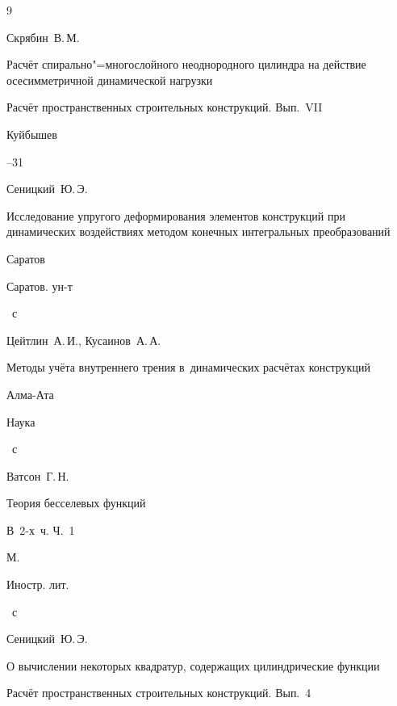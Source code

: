 \begin{thebibliography}{9}




\by Скрябин~В.\,М.

\paper Расчёт спирально"=многослойного неоднородного цилиндра на действие осесимметричной динамической нагрузки

\inbook Расчёт пространственных строительных конструкций. Вып.~VII

\publaddr Куйбышев


--31




\by Сеницкий~Ю.\,Э.

\book Исследование упругого деформирования элементов конструкций при динамических воздействиях методом конечных интегральных преобразований

\publaddr Саратов

\publ Саратов. ун-т


~с




\by Цейтлин~А.\,И., Кусаинов~А.\,А.

\book Методы учёта внутреннего трения в~динамических расчётах конструкций

\publaddr Алма-Ата

\publ Наука


~с




\by Ватсон~Г.\,Н. 

\book Теория бесселевых функций

\bookinfo В~2-х~ч. Ч.~1

\publaddr М.

\publ Иностр. лит.


~с




\by Сеницкий~Ю.\,Э. 

\paper О вычислении некоторых квадратур, содержащих цилиндрические функции

\inbook Расчёт пространственных строительных конструкций. Вып.~4


\end{thebibliography}
